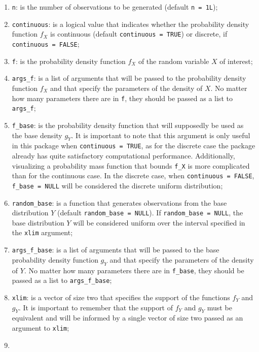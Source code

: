 \begin{enumerate}
\def\labelenumi{\arabic{enumi}.}
\tightlist
\item
  \texttt{n}: is the number of observations to be generated (default \texttt{n\ =\ 1L});
\item
  \texttt{continuous}: is a logical value that indicates whether the probability density function \(f_X\) is continuous (default \texttt{continuous\ =\ TRUE}) or discrete, if \texttt{continuous\ =\ FALSE};
\item
  \texttt{f}: is the probability density function \(f_X\) of the random variable \(X\) of interest;
\item
  \texttt{args\_f}: is a list of arguments that will be passed to the probability density function \(f_X\) and that specify the parameters of the density of \(X\). No matter how many parameters there are in \texttt{f}, they should be passed as a list to \texttt{args\_f};
\item
  \texttt{f\_base}: is the probability density function that will supposedly be used as the base density \(g_Y\). It is important to note that this argument is only useful in this package when \texttt{continuous\ =\ TRUE}, as for the discrete case the package already has quite satisfactory computational performance. Additionally, visualizing a probability mass function that bounds \texttt{f\_X} is more complicated than for the continuous case. In the discrete case, when \texttt{continuous\ =\ FALSE}, \texttt{f\_base\ =\ NULL} will be considered the discrete uniform distribution;
\item
  \texttt{random\_base}: is a function that generates observations from the base distribution \(Y\) (default \texttt{random\_base\ =\ NULL}). If \texttt{random\_base\ =\ NULL}, the base distribution \(Y\) will be considered uniform over the interval specified in the \texttt{xlim} argument;
\item
  \texttt{args\_f\_base}: is a list of arguments that will be passed to the base probability density function \(g_Y\) and that specify the parameters of the density of \(Y\). No matter how many parameters there are in \texttt{f\_base}, they should be passed as a list to \texttt{args\_f\_base};
\item
  \texttt{xlim}: is a vector of size two that specifies the support of the functions \(f_Y\) and \(g_Y\). It is important to remember that the support of \(f_Y\) and \(g_Y\) must be equivalent and will be informed by a single vector of size two passed as an argument to \texttt{xlim};
\item

\end{enumerate}
